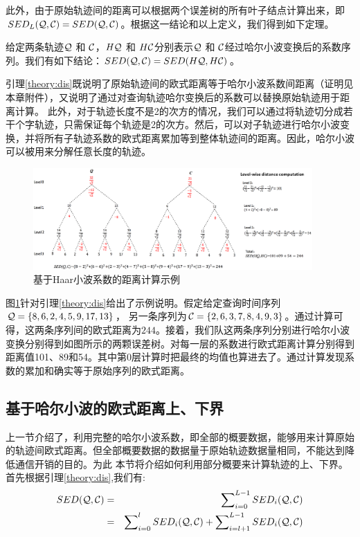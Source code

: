 此外，由于原始轨迹间的距离可以根据两个误差树的所有叶子结点计算出来，即$SED_{L}{(\cal Q, \cal C)} = SED(\cal Q, \cal C)$。根据这一结论和以上定义，我们得到如下定理。
\begin{lemma}\label{theory:dis}
	给定两条轨迹${\cal Q}$ 和 ${\cal C}$，$H{\cal Q}$ 和 $H{\cal C}$分别表示${\cal Q}$ 和 ${\cal C}$经过哈尔小波变换后的系数序列。我们有如下结论：$SED({\cal Q},{\cal C})=SED(H{\cal Q},H{\cal C})$。
\end{lemma}
引理\ref{theory:dis}既说明了原始轨迹间的欧式距离等于哈尔小波系数间距离（证明见本章附件），又说明了通过对查询轨迹哈尔变换后的系数可以替换原始轨迹用于距离计算。
此外，对于轨迹长度不是2的次方的情况，我们可以通过将轨迹切分成若干个字轨迹，只需保证每个轨迹是2的次方。然后，可以对子轨迹进行哈尔小波变换，并将所有子轨迹系数的欧式距离累加等到整体轨迹间的距离。因此，哈尔小波可以被用来分解任意长度的轨迹。

\begin{figure}
	\centering
	\includegraphics[width=0.95\textwidth]{Fig/chapter4/distance}
	\caption{基于Haar小波系数的距离计算示例}
	\label{fig-chapter4-distance}
\end{figure}

图\ref{fig-chapter4-distance}针对引理\ref{theory:dis}给出了示例说明。假定给定查询时间序列${\cal Q} = \{8, 6, 2, 4, 5, \\9, 17, 13\}$，
另一条序列为${\cal C}=\{2, 6, 3, 7, 8, 4, 9, 3\}$。通过计算可得，这两条序列间的欧式距离为$244$。接着，我们队这两条序列分别进行哈尔小波变换分别得到如图所示的两颗误差树。对每一层的系数进行欧式距离计算分别得到距离值101、89和54。其中第$0$层计算时把最终的均值也算进去了。通过计算发现系数的累加和确实等于原始序列的欧式距离。

\subsection{基于哈尔小波的欧式距离上、下界}
上一节介绍了，利用完整的哈尔小波系数，即全部的概要数据，能够用来计算原始的轨迹间欧式距离。但全部概要数据的数据量于原始轨迹数据量相同，不能达到降低通信开销的目的。为此
本节将介绍如何利用部分概要来计算轨迹的上、下界。首先根据引理\ref{theory:dis},我们有:
\begin{eqnarray}\label{eq:match}
SED({\cal Q},{\cal C}) &=& \sum\nolimits_{i=0}^{L-1}SED_{i}({\cal Q},{\cal C}) \nonumber\\ 
           &=&\sum\nolimits_{i=0}^{l}SED_{i}({\cal Q},{\cal C})+\sum\nolimits_{i=l+1}^{L-1}SED_{i}({\cal Q},{\cal C})
\end{eqnarray}

